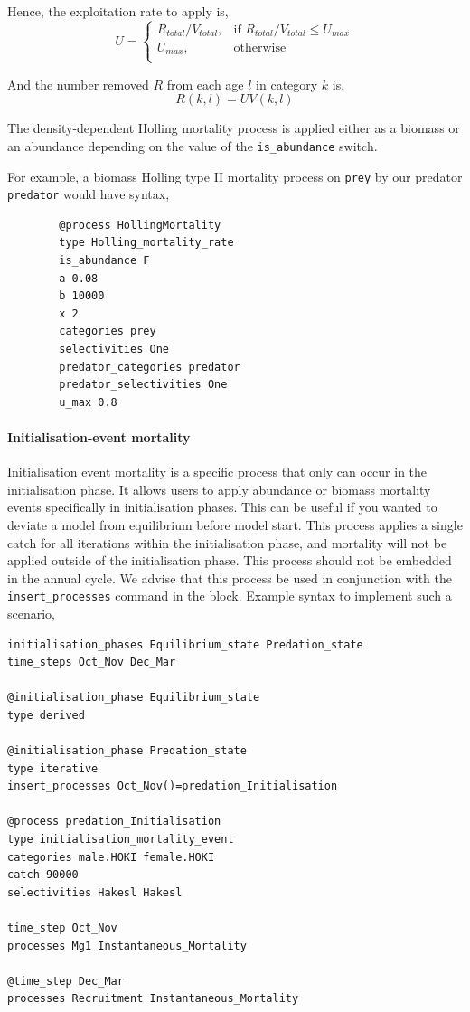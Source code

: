 Hence, the exploitation rate to apply is,
\begin{equation}
	U = \begin{cases}
		R_{total}/V_{total}, & \text{if $R_{total}/V_{total} \leq U_{max}$} \\
		U_{max}, & \text{otherwise}\\
	\end{cases}
\end{equation}

And the number removed $R$ from each age $l$ in category $k$ is,
\begin{equation}
	R(k,l) = UV(k,l)
\end{equation}

The density-dependent Holling mortality process is applied either as a biomass or an abundance depending on the value of the \texttt{is\_abundance} switch.

For example, a biomass Holling type II mortality process on \texttt{prey} by our predator \texttt{predator} would have syntax,

{\small{\begin{verbatim}
		@process HollingMortality
		type Holling_mortality_rate
		is_abundance F
		a 0.08
		b 10000
		x 2
		categories prey
		selectivities One
		predator_categories predator
		predator_selectivities One
		u_max 0.8
		\end{verbatim}}}

\paragraph{Initialisation-event mortality}

Initialisation event mortality is a specific process that only can occur in the initialisation phase. It allows users to apply abundance or biomass mortality events specifically in initialisation phases. This can be useful if you wanted to deviate a model from equilibrium before model start. This process applies a single catch for all iterations within the initialisation phase, and mortality will not be applied outside of the initialisation phase. This process should not be embedded in the annual cycle. We advise that this process be used in conjunction with the \texttt{insert\_processes} command in the  block. Example syntax to implement such a scenario,

{\small{\begin{verbatim}
initialisation_phases Equilibrium_state Predation_state
time_steps Oct_Nov Dec_Mar

@initialisation_phase Equilibrium_state
type derived

@initialisation_phase Predation_state
type iterative
insert_processes Oct_Nov()=predation_Initialisation

@process predation_Initialisation
type initialisation_mortality_event
categories male.HOKI female.HOKI
catch 90000
selectivities Hakesl Hakesl

time_step Oct_Nov
processes Mg1 Instantaneous_Mortality

@time_step Dec_Mar
processes Recruitment Instantaneous_Mortality
\end{verbatim}}}

